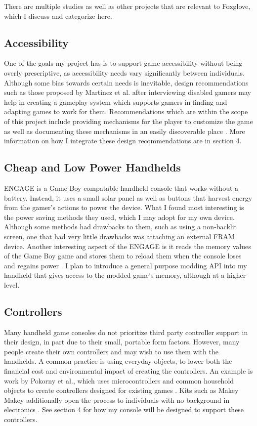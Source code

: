 \documentclass[10pt,twocolumn]{article}
\begin{document}
There are multiple studies as well as other projects that are relevant to
Foxglove, which I discuss and categorize here.

\subsection{Accessibility}

One of the goals my project has is to support game accessibility without being
overly prescriptive, as accessibility needs vary significantly between
individuals. Although some bias towards certain needs is inevitable, design
recommendations such as those proposed by Martinez et al. after interviewing
disabled gamers may help in creating a gameplay system which supports gamers in
finding and adapting games to work for them. Recommendations which are within
the scope of this project include providing mechanisms for the player to
customize the game as well as documenting these mechanisms in an easily
discoverable place \cite{martinez_playing_2024}. More information on how I
integrate these design recommendations are in section 4.

\subsection{Cheap and Low Power Handhelds}

ENGAGE is a Game Boy compatable handheld console that works
without a battery.
Instead, it uses a small solar panel as well as buttons that harvest energy
from the gamer's actions to power the device.
What I found most interesting is the power saving methods they used,
which I may adopt for my own device.
Although some methods had drawbacks to them, such as using a non-backlit screen,
one that had very little drawbacks was attaching an external FRAM device.
Another interesting aspect of the ENGAGE is it
reads the memory values of the Game Boy game
and stores them to reload them
when the console loses and regains power \cite{de_winkel_battery-free_2020}.
I plan to introduce a general purpose modding API into my handheld that
gives access to the modded game's memory, although at a higher level.

\subsection{Controllers}

Many handheld game consoles do not prioritize third party controller support
in their design, in part due to their small, portable form factors.
However, many people create their own controllers and may wish
to use them with the handhelds. A common practice is using everyday objects, to
lower both the financial cost and environmental impact of
creating the controllers. An example is work by Pokorny et al., which uses
microcontrollers and common household objects to create controllers designed for
existing games \cite{pokorny_bin_2023}. Kits such as Makey Makey additionally
open the process to individuals with no background in electronics
\cite{collective_makey_2012}. See section 4 for how my console will be designed
to support these controllers.
\end{document}
